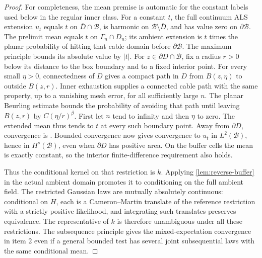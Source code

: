 \begin{proof}
For completeness, the mean premise is automatic for the constant labels
used below in the regular inner class. For a constant \(t\), the full
continuum ALS extension \(u_t\) equals \(t\) on \(\overline D\cap\mathcal B\), is
harmonic on \(\mathcal B\setminus\overline D\), and has value zero on
\(\partial\mathcal B\). The prelimit mean equals \(t\) on
\(\Gamma_n\cap D_n\); its ambient extension is \(t\) times the planar
probability of hitting that cable domain before \(\partial\mathcal B\).
The maximum principle bounds its absolute value by \(|t|\).
For \(z\in\partial D\cap\mathcal B\), fix a radius \(r>0\) below its
distance to the box boundary and to a fixed interior point. For every
small \(\eta>0\), connectedness of \(D\) gives a compact path in \(D\)
from \(B(z,\eta)\) to outside \(B(z,r)\). Inner exhaustion supplies a
connected cable path with the same property, up to a vanishing mesh
error, for all sufficiently large \(n\). The planar Beurling estimate
\cite[Lemma~4.1]{ALS2018} bounds the probability of avoiding that path
until leaving \(B(z,r)\) by \(C(\eta/r)^\beta\). First let \(n\) tend to
infinity and then \(\eta\) to zero. The extended mean thus tends to \(t\)
at every such boundary point. Away from \(\partial D\), convergence is
\cite[Lemma~4.2(1)]{ALS2018}. Bounded convergence now gives convergence
to \(u_t\) in \(L^2(\mathcal B)\), hence in \(H^s(\mathcal B)\), even
when \(\partial D\) has positive area. On the buffer cells the mean is
exactly constant, so the interior finite-difference requirement also holds.

Thus the conditional kernel on that restriction is \(k\). Applying
\cref{lem:reverse-buffer} in the actual ambient domain promotes it to
conditioning on the full ambient field. The restricted Gaussian laws
are mutually absolutely continuous: conditional on \(H\), each is a
Cameron--Martin translate of the reference restriction with a strictly
positive likelihood, and integrating such translates preserves
equivalence. The representative of \(k\) is therefore unambiguous
under all these restrictions. The subsequence principle gives the
mixed-expectation convergence in item 2 even if a general bounded
test has several joint subsequential laws with the same conditional
mean.


\end{proof}

